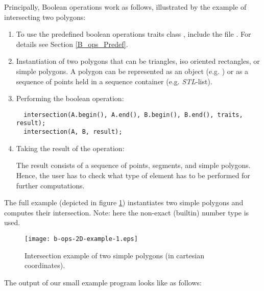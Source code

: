 


\ccExample

Principally, Boolean operations work as follows, illustrated by the example
of intersecting two polygons:
\begin{enumerate}

\item  
To use the predefined boolean operations traits class
,
include the file .
For details see Section \ref{B_ops_Predef}.

\item 
Instantiation of two polygons that can be triangles,
iso oriented rectangles, or simple polygons.
A polygon can be represented as an object (e.g. )
or as a sequence of points held
in a sequence container (e.g. \emph{STL}-list).

\item Performing the boolean operation:

\begin{verbatim}
  intersection(A.begin(), A.end(), B.begin(), B.end(), traits, result);
  intersection(A, B, result);
\end{verbatim}

\item Taking the result of the operation:

The result consists of a sequence of points, segments, and simple
polygons. Hence,
the user has to check what type of element has to be performed for further
computations.

\end{enumerate}

The full example (depicted in figure \ref{fig-example-1})
instantiates two simple polygons and computes their intersection. 
Note: here the non-exact (builtin) number type  is used.

\begin{figure}[th]
  \begin{center}
    \texttt{[image: b-ops-2D-example-1.eps]}
    \caption{Intersection example of two simple polygons
             (in cartesian coordinates).}
    \label{fig-example-1}
  \end{center}
\end{figure}
 

The output of our small example program looks like as follows:

